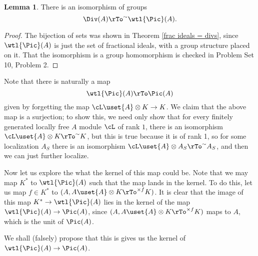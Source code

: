 \documentclass[12 pt]{article}
\theoremstyle{definition}
\newtheorem{lemma}[theorem]{Lemma}
\begin{document}
\begin{lemma} There is an isomorphism of groups
\[\Div(A) \rTo^\sim \wtl{\Pic}(A).\]
\label{div is pictilde}
\end{lemma}
\begin{proof}
The bijection of sets was shown in Theorem \ref{frac ideals = divs}, since $\wtl{\Pic}(A)$ is just the set of fractional ideals, with a group structure placed on it. That the isomorphism is a group homomorphism is checked in Problem Set 10, Problem 2.
\end{proof}

Note that there is naturally a map
\[\wtl{\Pic}(A) \rTo \Pic(A)\]
given by forgetting the map $\cL \uset{A}\otimes K \to K$. We claim that the above map is a surjection; to show this, we need only show that for every finitely generated locally free $A$ module $\cL$ of rank $1$, there is an isomorphism $\cL \uset{A}\otimes K \rTo^\sim K$, but this is true because it is of rank 1, so for some localization $A_S$ there is an isomorphism $\cL \uset{A}\otimes A_S \rTo^\sim A_S$, and then we can just further localize.

Now let us explore the what the kernel of this map could be. Note that we may map $K^*$ to $\wtl{\Pic}(A)$ such that the map lands in the kernel. To do this, let us map $f \in K^*$ to $(A, A \uset{A}\otimes K \rTo^{\times f} K)$. It is clear that the image of this map $K^* \to \wtl{\Pic}(A)$ lies in the kernel of the map $\wtl{\Pic}(A) \to \Pic(A)$, since $(A, A \uset{A}\otimes K \rTo^{\times f} K)$ maps to $A$, which is the unit of $\Pic(A)$.

We shall (falsely) propose that this is gives us the kernel of $\wtl{\Pic}(A) \to \Pic(A)$.
\end{document}

